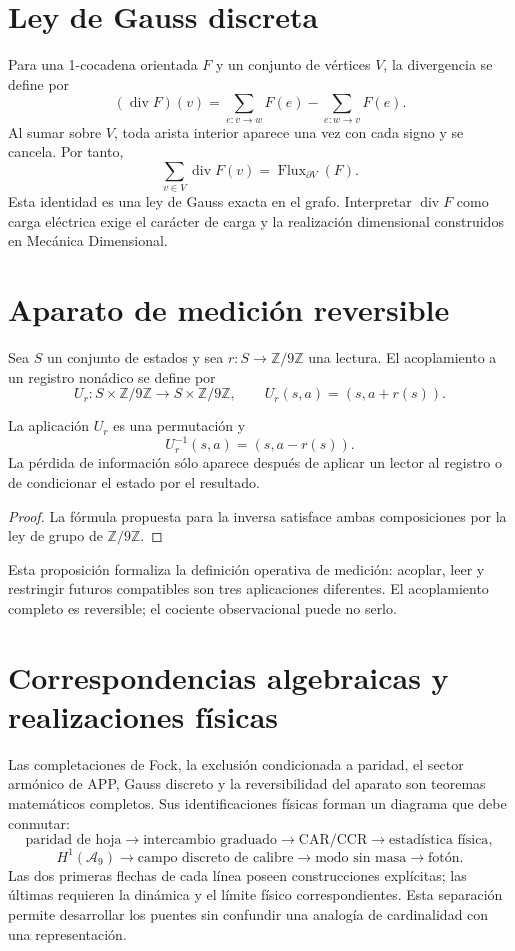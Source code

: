 \section{Ley de Gauss discreta}

Para una 1-cocadena orientada \(F\) y un conjunto de vértices \(V\), la
divergencia se define por
\[
 (\operatorname{div}F)(v)=
 \sum_{e:v\to w}F(e)-\sum_{e:w\to v}F(e).
\]
Al sumar sobre \(V\), toda arista interior aparece una vez con cada signo y
se cancela. Por tanto,
\[
 \boxed{
 \sum_{v\in V}\operatorname{div}F(v)
 =\operatorname{Flux}_{\partial V}(F).}
\]
Esta identidad es una ley de Gauss exacta en el grafo. Interpretar
\(\operatorname{div}F\) como carga eléctrica exige el carácter de carga y la
realización dimensional construidos en Mecánica Dimensional.

\section{Aparato de medición reversible}

Sea \(S\) un conjunto de estados y sea \(r:S\to\mathbb Z/9\mathbb Z\) una
lectura. El acoplamiento a un registro nonádico se define por
\[
 U_r:S\times\mathbb Z/9\mathbb Z\longrightarrow
 S\times\mathbb Z/9\mathbb Z,
 \qquad
 U_r(s,a)=(s,a+r(s)).
\]

\begin{proposition}
La aplicación \(U_r\) es una permutación y
\[
 U_r^{-1}(s,a)=(s,a-r(s)).
\]
La pérdida de información sólo aparece después de aplicar un lector al
registro o de condicionar el estado por el resultado.
\end{proposition}

\begin{proof}
La fórmula propuesta para la inversa satisface ambas composiciones por la
ley de grupo de \(\mathbb Z/9\mathbb Z\).
\end{proof}

Esta proposición formaliza la definición operativa de medición: acoplar,
leer y restringir futuros compatibles son tres aplicaciones diferentes. El
acoplamiento completo es reversible; el cociente observacional puede no serlo.

\section{Correspondencias algebraicas y realizaciones físicas}

Las completaciones de Fock, la exclusión condicionada a paridad, el sector
armónico de APP, Gauss discreto y la reversibilidad del aparato son teoremas
matemáticos completos. Sus identificaciones físicas forman un diagrama que
debe conmutar:
\[
 \text{paridad de hoja}
 \longrightarrow\text{intercambio graduado}
 \longrightarrow\text{CAR/CCR}
 \longrightarrow\text{estadística física},
\]
\[
 H^1(\mathcal A_9)
 \longrightarrow\text{campo discreto de calibre}
 \longrightarrow\text{modo sin masa}
 \longrightarrow\text{fotón}.
\]
Las dos primeras flechas de cada línea poseen construcciones explícitas; las
últimas requieren la dinámica y el límite físico correspondientes. Esta
separación permite desarrollar los puentes sin confundir una analogía de
cardinalidad con una representación.
